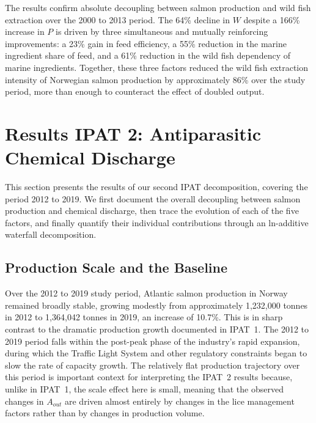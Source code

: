 \documentclass[12pt, a4paper]{report}
\begin{document}
The results confirm absolute decoupling between salmon production and wild fish extraction over the 2000 to 2013 period. The 64\% decline in $W$ despite a 166\% increase in $P$ is driven by three simultaneous and mutually reinforcing improvements: a 23\% gain in feed efficiency, a 55\% reduction in the marine ingredient share of feed, and a 61\% reduction in the wild fish dependency of marine ingredients. Together, these three factors reduced the wild fish extraction intensity of Norwegian salmon production by approximately 86\% over the study period, more than enough to counteract the effect of doubled output.
















\chapter{Results IPAT 2: Antiparasitic Chemical Discharge}

This section presents the results of our second IPAT decomposition,
covering the period 2012 to 2019. We first document the overall
decoupling between salmon production and chemical discharge, then
trace the evolution of each of the five factors, and finally quantify
their individual contributions through an ln-additive waterfall
decomposition.

\section{Production Scale and the Baseline}

Over the 2012 to 2019 study period, Atlantic salmon production in Norway
remained broadly stable, growing modestly from approximately 1,232,000
tonnes in 2012 to 1,364,042 tonnes in 2019, an increase of 10.7\%.
This is in sharp contrast to the dramatic production growth documented
in IPAT~1. The 2012 to 2019 period falls within the post-peak phase of
the industry's rapid expansion, during which the Traffic Light System
and other regulatory constraints began to slow the rate of capacity
growth. The relatively flat production trajectory over this period is
important context for interpreting the IPAT~2 results because, unlike in
IPAT~1, the scale effect here is small, meaning that the observed
changes in $A_{out}$ are driven almost entirely by changes in the
lice management factors rather than by changes in production volume.
\end{document}
